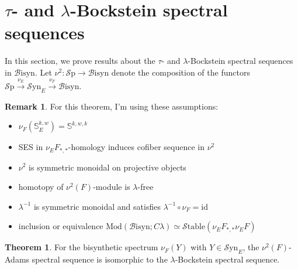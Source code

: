 \documentclass[10pt]{amsart}
\theoremstyle{definition}
\numberwithin{figure}{section}
\numberwithin{equation}{section}
\newtheorem{thm}[figure]{Theorem}
\newtheorem{rem}[figure]{Remark}
\theoremstyle{cited}
\newcommand{\Sp}{{\mathcal{S}\mathrm{p}}}
\newcommand{\Mod}{\mathrm{Mod}}
\newcommand{\Syn}{\mathcal{S}\mathrm{yn}}
\newcommand{\Bisyn}{\mathcal{B}\mathrm{isyn}}
\newcommand{\Stable}{\mathcal{S}\mathrm{table}}
\begin{document}
\section{$\tau$- and $\lambda$-Bockstein spectral sequences}

In this section, we prove results about the $\tau$- and $\lambda$-Bockstein spectral sequences in $\Bisyn$. Let $\nu^2:\Sp\to\Bisyn$ denote the composition of the functors $\Sp\xrightarrow{\nu_E}\Syn_E\xrightarrow{\nu_F}\Bisyn$.

\begin{rem}
For this theorem, I'm using these assumptions:
\begin{itemize}
\item $\nu_F(\mathbb{S}^{k,w}_E) = \mathbb{S}^{k,w,k}$
\item SES in $\nu_EF_{*,*}$-homology induces cofiber sequence in $\nu^2$
\item $\nu^2$ is symmetric monoidal on projective objects
\item homotopy of $\nu^2(F)$-module is $\lambda$-free
\item $\lambda^{-1}$ is symmetric monoidal and satisfies $\lambda^{-1}\circ\nu_F=\mathrm{id}$
\item inclusion or equivalence $\Mod(\Bisyn;C\lambda)\simeq\Stable(\nu_EF_{*,*}\nu_EF)$
\end{itemize}
\end{rem}

\begin{thm}
    For the bisynthetic spectrum $\nu_F(Y)$ with $Y\in\Syn_E$, the $\nu^2(F)$-Adams spectral sequence is isomorphic to the $\lambda$-Bockstein spectral sequence. 
\end{thm}
\end{document}
